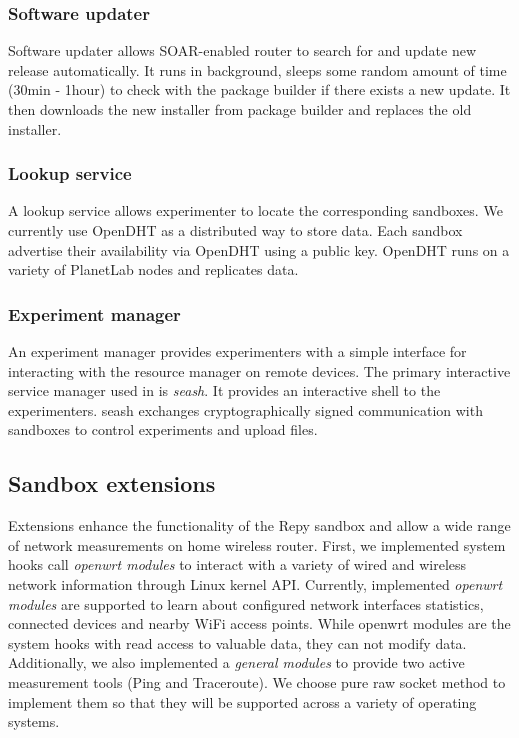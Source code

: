 \subsubsection{Software updater}
\label{sec.softwareupdater}
Software updater allows SOAR-enabled router to search for and update new release automatically. It runs in background, sleeps some random amount of time (30min - 1hour) to check with the package builder if there exists a new update. It then downloads the new installer from package builder and replaces the old installer.

\subsubsection{Lookup service}
\label{sec.lookupservice}
A lookup service allows experimenter to locate the corresponding sandboxes. We currently use OpenDHT\cite{rhea2005opendht} as a distributed way to store data. Each sandbox advertise their availability via OpenDHT using a public key. OpenDHT runs on a variety of PlanetLab nodes and replicates data.

\subsubsection{Experiment manager}
\label{sec.seash}
An experiment manager provides experimenters with a simple interface for interacting with the resource manager on remote devices. The primary interactive service manager used in \sysname is \textit{seash}\cite{seash}. It provides an interactive shell to the experimenters. seash exchanges cryptographically signed communication with sandboxes to control experiments and upload files.

\subsection{Sandbox extensions}
\label{sec.extensions}
Extensions enhance the functionality of the Repy sandbox and allow a wide range of network measurements on home wireless router. First, we implemented system hooks call \textit{openwrt modules} to interact with a variety of wired and wireless network information through Linux kernel API. Currently, implemented \textit{openwrt modules} are supported to learn about configured network interfaces statistics, connected devices and nearby WiFi access points. While openwrt modules are the system hooks with read access to valuable data, they can not modify data. Additionally, we also implemented a \textit{general modules} to provide two active measurement tools (Ping and Traceroute). We choose pure raw socket method to implement them so that they will be supported across a variety of operating systems. 


